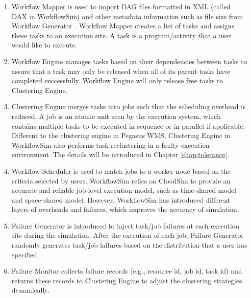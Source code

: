 \begin{enumerate}

\item {Workflow Mapper} is used to import DAG files formatted in XML (called DAX in WorkflowSim) and other metadata information such as file size from Workflow Generator \cite{WorkflowGenerator}. Workflow Mapper creates a list of tasks and assigns these tasks to an execution site. A task is a program/activity that a user would like to execute. 

\item{Workflow Engine} manages tasks based on their dependencies between tasks to assure that a task may only be released when all of its parent tasks have completed successfully. Workflow Engine will only release free tasks to Clustering Engine. 

\item{Clustering Engine} merges tasks into jobs such that the scheduling overhead is reduced. A job is an atomic unit seen by the execution system, which contains multiple tasks to be executed in sequence or in parallel if applicable. Different to the clustering engine in Pegasus WMS, Clustering Engine in WorkflowSim also performs task reclustering in a faulty execution environment. The details will be introduced in Chapter \ref{chap:tolerance}. 

\item{Workflow Scheduler} is used to match jobs to a worker node based on the criteria selected by users. WorkflowSim relies on CloudSim to provide an accurate and reliable job-level execution model, such as time-shared model and space-shared model. However, WorkflowSim has introduced different layers of overheads and failures, which improves the accuracy of simulation. 

\item{Failure Generator} is introduced to inject task/job failures at each execution site during the simulation. After the execution of each job, Failure Generator randomly generates task/job failures based on the distribution that a user has specified. 

\item{Failure Monitor} collects failure records (e.g., resource id, job id, task id) and returns these records to Clustering Engine to adjust the clustering strategies dynamically. 

\end{enumerate}




